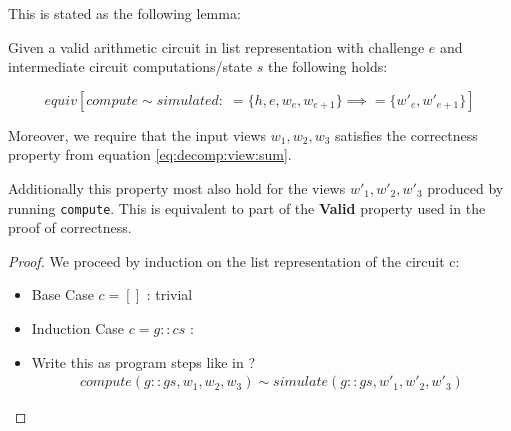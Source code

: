 This is stated as the following lemma:


\begin{lemma}
  \label{lem:zkboo:decomposition:privacy_aux}
  Given a valid arithmetic circuit in list representation with challenge $e$ and
  intermediate circuit computations/state $s$ the following holds:

  \[
    equiv[compute \sim simulated : \; =\!\{h, e, w_{e}, w_{e+1}\} \implies =\!\{w'_{e}, w'_{e+1}\}]
  \]

  Moreover, we require that the input views $w_{1}, w_{2}, w_{3}$ satisfies the
  correctness property from equation \ref{eq:decomp:view:sum}.

  Additionally this property most also hold for the views
  $w'_{1}, w'_{2}, w'_{3}$ produced by running \texttt{compute}. This is
  equivalent to part of the \textbf{Valid} property used in the proof of
  correctness.

\end{lemma}
\begin{proof}
  We proceed by induction on the list representation of the circuit c:

  \begin{itemize}
    \item Base Case $c = []$ : trivial
    \item Induction Case $c = g::cs$ :
    \item Write this as program steps like in \cite{certicrypt_sigma}?
      \begin{align*}
        compute(g::gs, w_{1}, w_{2}, w_{3}) \sim simulate(g::gs, w'_{1}, w'_{2}, w'_{3} )
      \end{align*}
  \end{itemize}

\end{proof}

